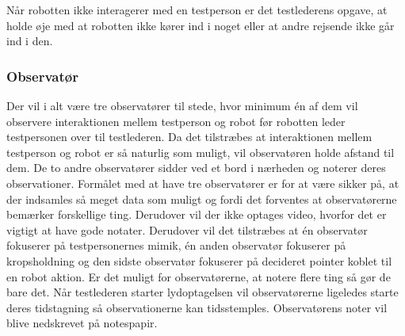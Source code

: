 Når robotten ikke interagerer med en testperson er det testlederens opgave, at holde øje med at robotten ikke kører ind i noget eller at andre rejsende ikke går ind i den.    

\subsubsection*{Observatør}
Der vil i alt være tre observatører til stede, hvor minimum én af dem vil observere interaktionen mellem testperson og robot før robotten leder testpersonen over til testlederen. Da det tilstræbes at interaktionen mellem testperson og robot er så naturlig som muligt, vil observatøren holde afstand til dem. De to andre observatører sidder ved et bord i nærheden og noterer deres observationer. Formålet med at have tre observatører er for at være sikker på, at der indsamles så meget data som muligt og fordi det forventes at observatørerne bemærker forskellige ting. Derudover vil der ikke optages video, hvorfor det er vigtigt at have gode notater. Derudover vil det tilstræbes at én observatør fokuserer på testpersonernes mimik, én anden observatør fokuserer på kropsholdning og den sidste observatør fokuserer på decideret pointer koblet til en robot aktion. Er det muligt for observatørerne, at notere flere ting så gør de bare det. Når testlederen starter lydoptagelsen vil observatørerne ligeledes starte deres tidstagning så observationerne kan tidsstemples. Observatørens noter vil blive nedskrevet på notespapir. 
